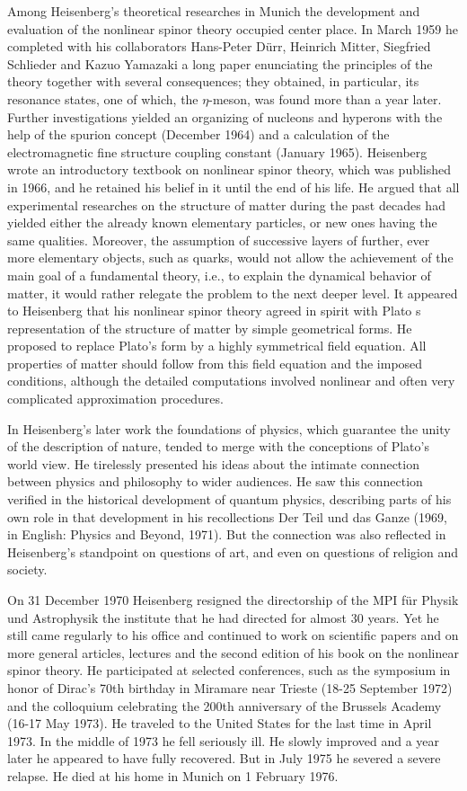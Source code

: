 \documentclass{article}
\begin{document}
Among Heisenberg's theoretical researches in Munich the development and evaluation of the nonlinear spinor theory occupied center place. In March 1959 he completed with his collaborators Hans-Peter Dürr, Heinrich Mitter, Siegfried Schlieder and Kazuo Yamazaki a long paper enunciating the principles of the theory together with several consequences; they obtained, in particular, its resonance states, one of which, the $\eta$-meson, was found more than a year later. Further investigations yielded an organizing of nucleons and hyperons with the help of the spurion concept (December 1964) and a calculation of the electromagnetic fine structure coupling constant (January 1965). Heisenberg wrote an introductory textbook on nonlinear spinor theory, which was published in 1966, and he retained his belief in it until the end of his life. He argued that all experimental researches on the structure of matter during the past decades had yielded either the already known elementary particles, or new ones having the same qualities. Moreover, the assumption of successive layers of further, ever more elementary objects, such as quarks, would not allow the achievement of the main goal of a fundamental theory, i.e., to explain the dynamical behavior of matter, it would rather relegate the problem to the next deeper level. It appeared to Heisenberg that his nonlinear spinor theory agreed in spirit with Plato s representation of the structure of matter by simple geometrical forms. He proposed to replace Plato's form by a highly symmetrical field equation. All properties of matter should follow from this field equation and the imposed conditions, although the detailed computations involved nonlinear and often very complicated approximation procedures.

In Heisenberg's later work the foundations of physics, which guarantee the unity of the description of nature, tended to merge with the conceptions of Plato's world view. He tirelessly presented his ideas about the intimate connection between physics and philosophy to wider audiences. He saw this connection verified in the historical development of quantum physics, describing parts of his own role in that development in his recollections Der Teil und das Ganze (1969, in English: Physics and Beyond, 1971). But the connection was also reflected in Heisenberg's standpoint on questions of art, and even on questions of religion and society.

On 31 December 1970 Heisenberg resigned the directorship of the MPI für Physik und Astrophysik the institute that he had directed for almost 30 years. Yet he still came regularly to his office and continued to work on scientific papers and on more general articles, lectures and the second edition of his book on the nonlinear spinor theory. He participated at selected conferences, such as the symposium in honor of Dirac's 70th birthday in Miramare near Trieste (18-25 September 1972) and the colloquium celebrating the 200th anniversary of the Brussels Academy (16-17 May 1973). He traveled to the United States for the last time in April 1973. In the middle of 1973 he fell seriously ill. He slowly improved and a year later he appeared to have fully recovered. But in July 1975 he severed a severe relapse. He died at his home in Munich on 1 February 1976.
\end{document}
